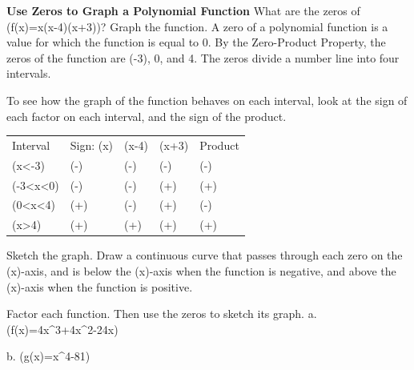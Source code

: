 \documentclass{article}
\newenvironment{example}[1]{}{}         %
\newenvironment{tryit}[1]{}{}           %
\newcommand{\answer}[1]{}               %
\newcommand{\placeholder}[2]{}          %
\newcommand{\te}[1]{}                   %
\begin{document}
\begin{example}{1}
\textbf{Use Zeros to Graph a Polynomial Function}
What are the zeros of (f(x)=x(x-4)(x+3))? Graph the function.
A zero of a polynomial function is a value for which the function is equal to 0. By the Zero-Product Property, the zeros of the function are (-3), 0, and 4.
The zeros divide a number line into four intervals.
\placeholder{diagram}{Number line with arrows at both ends and marked values -3, 0, 4, dividing it into four intervals.}
To see how the graph of the function behaves on each interval, look at the sign of each factor on each interval, and the sign of the product.
\begin{tabular}{lllll}
Interval & Sign: (x) & (x-4) & (x+3) & Product \\
(x<-3) & (-) & (-) & (-) & (-) \\
(-3<x<0) & (-) & (-) & (+) & (+) \\
(0<x<4) & (+) & (-) & (+) & (-) \\
(x>4) & (+) & (+) & (+) & (+) \\
\end{tabular}
\te{Callout: The last column shows the sign of the product of the three factors. GENERALIZE Recall using the Zero-Product Property to find the zeros of quadratic polynomials. The zeros of a quadratic function relate to the factors: when x = a is a zero of the function, then (x-a) is a factor of the polynomial. The Zero-Product Property applies to polynomials of any degree. CONTINUED ON THE NEXT PAGE.}
Sketch the graph. Draw a continuous curve that passes through each zero on the (x)-axis, and is below the (x)-axis when the function is negative, and above the (x)-axis when the function is positive.
\placeholder{graph}{Gray cubic crossing x-axis at -3, 0, 4, local maximum near (-1.7,13) and minimum near (2.3,-21); x labels -6,-4,-2,O,2,4,6; y labels 20,10,-10,-20.}
\te{STUDY TIP The zeros do not tell you how a function behaves on an interval, just that a function may change between positive or negative at a zero.}
\answer{Zeros: (-3), 0, 4. See graph.}
\end{example}
\begin{tryit}{1}
Factor each function. Then use the zeros to sketch its graph.
a. (f(x)=4x^3+4x^2-24x)
\answer{Zeros are (-3), 0, and 2.}
\placeholder{graph}{Red cubic crossing at -3,0,2 with left end down and right end up; x grid step 1 and labeled -2; y grid step 10 and labeled -20; origin O.}
b. (g(x)=x^4-81)
\answer{Zeros are (-3) and 3.}
\placeholder{graph}{Red quartic symmetric about y-axis with zeros -3 and 3, flat minimum at (0,-81); x labels -2,2, origin O; y labels 40,-40, grid step 20.}
\end{tryit}
\end{document}
